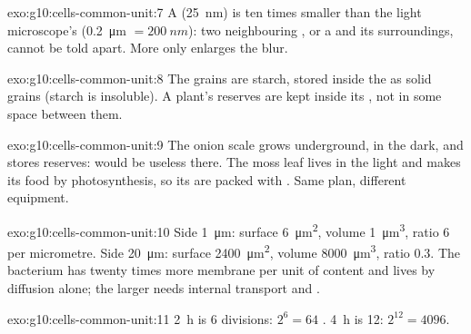 \begin{solution}{exo:g10:cells-common-unit:7}
A  (\qty{25}{nm}) is ten times smaller than the light
microscope's  (\qty{0.2}{\micro m} $= \qty{200}{nm}$): two
neighbouring , or a  and its surroundings, cannot be
told apart. More  only enlarges the blur.
\end{solution}

\begin{solution}{exo:g10:cells-common-unit:8}
The grains are starch, stored inside the  as solid grains (starch
is insoluble). A plant's reserves are kept inside its , not in
some space between them.
\end{solution}

\begin{solution}{exo:g10:cells-common-unit:9}
The onion scale grows underground, in the dark, and stores reserves:
 would be useless there. The moss leaf lives in the light
and makes its food by photosynthesis, so its  are packed with
. Same plan, different equipment.
\end{solution}

\begin{solution}{exo:g10:cells-common-unit:10}
Side \qty{1}{\micro m}: surface \qty{6}{\micro m^2}, volume
\qty{1}{\micro m^3}, ratio 6 per micrometre. Side \qty{20}{\micro m}:
surface \qty{2400}{\micro m^2}, volume \qty{8000}{\micro m^3}, ratio
0.3. The bacterium has twenty times more membrane per unit of content
and lives by diffusion alone; the larger  needs internal transport
and .
\end{solution}

\begin{solution}{exo:g10:cells-common-unit:11}
\qty{2}{h} is 6 divisions: $2^6 = 64$ . \qty{4}{h} is 12:
$2^{12} = 4096$.
\end{solution}

